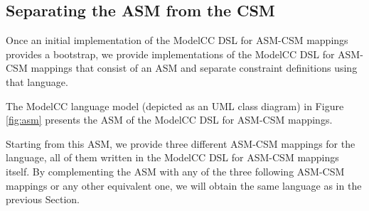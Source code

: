 \documentclass[floatfix,rmp,twocolumn,twoside]{revtex4}
\begin{document}
\subsection{Separating the ASM from the CSM} \label{sec:meta}

\noindent Once an initial implementation of the ModelCC DSL for ASM-CSM mappings provides a bootstrap, we provide implementations of the ModelCC DSL for ASM-CSM mappings that consist of an ASM and separate constraint definitions using that language.

The ModelCC language model (depicted as an UML class diagram) in Figure \ref{fig:asm} presents the ASM of the ModelCC DSL for ASM-CSM mappings.

Starting from this ASM, we provide three different ASM-CSM mappings for the language, all of them written in the ModelCC DSL for ASM-CSM mappings itself.
By complementing the ASM with any of the three following ASM-CSM mappings or any other equivalent one, we will obtain the same language as in the previous Section.
\end{document}
